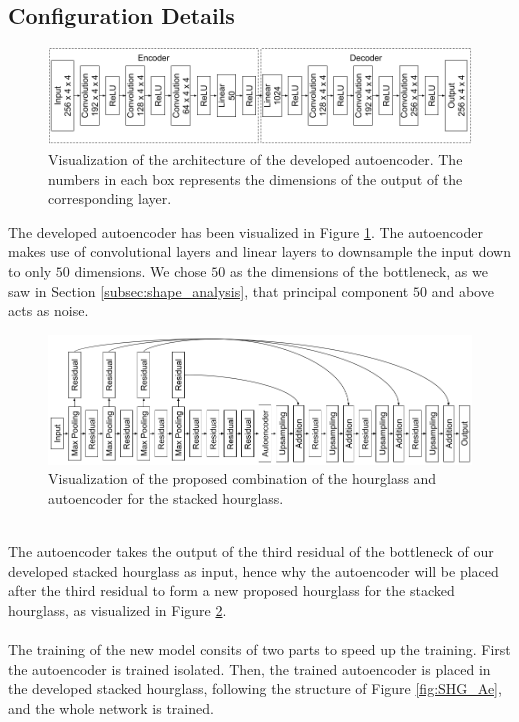 \documentclass[./main.tex]{subfiles}
\begin{document}
\subsection{Configuration Details}\label{subsec:improv_conf_details}
\begin{figure}[htbp]
    \centering
    \includegraphics[width = \textwidth]{entities/Ae_model.png}
    \caption{Visualization of the architecture of the developed autoencoder. The numbers in each box represents the dimensions of the output of the corresponding layer.}
    \label{fig:AE_model}
\end{figure}
The developed autoencoder has been visualized in Figure \ref{fig:AE_model}. The autoencoder makes use of convolutional layers and linear layers to downsample the input down to only $50$ dimensions. We chose $50$ as the dimensions of the bottleneck, as we saw in Section \ref{subsec:shape_analysis}, that principal component $50$ and above acts as noise.
\\
\begin{figure}[htbp]
    \centering
    \includegraphics[width = \textwidth]{entities/SHG_AE.png}
    \caption{Visualization of the proposed combination of the hourglass and autoencoder for the stacked hourglass.}
    \label{fig:SHG_AE}
\end{figure}
\\
The autoencoder takes the output of the third residual of the bottleneck of our developed stacked hourglass as input, hence why the autoencoder will be placed after the third residual to form a new proposed hourglass for the stacked hourglass, as visualized in Figure \ref{fig:SHG_AE}.
\\
\\
The training of the new model consits of two parts to speed up the training. First the autoencoder is trained isolated. Then, the trained autoencoder is placed in the developed stacked hourglass, following the structure of Figure \ref{fig:SHG_Ae}, and the whole network is trained.
\end{document}
